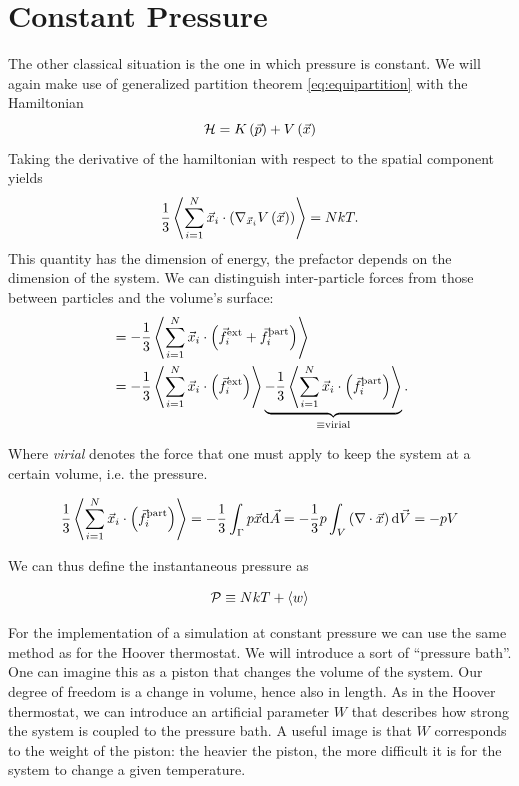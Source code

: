 \section{Constant Pressure}

The other classical situation is the one in which pressure is constant. We will again make use of generalized partition theorem \eqref{eq:equipartition} with the Hamiltonian
\begin{equation*}
\mathcal{H} = K\left(\vec{p}\right) + V\left(\vec{x}\right)
\end{equation*}
Taking the derivative of the hamiltonian with respect to the spatial component yields
\begin{equation*}
\frac{1}{3}\left<    \sum^N_{i=1}\vec{x}_i \cdot \left( \nabla_{\vec{x}_i} V\left(\vec{x}\right)   \right)    \right> = NkT.
\end{equation*}
This quantity has the dimension of energy, the prefactor depends on the dimension of the system. We can distinguish inter-particle forces  from those between particles and the volume's surface:
\begin{align*}
&=-\frac{1}{3}\left<    \sum^N_{i=1}\vec{x}_i \cdot \left( \vec{f}_i^{\text{ext}} + \vec{f}_i^{\text{part}}   \right)    \right> \\
&=-\frac{1}{3}\left<\sum^N_{i=1}\vec{x}_i \cdot \left( \vec{f}_i^{\text{ext}}   \right)    \right> 
\underbrace{-\frac{1}{3}\left<\sum^N_{i=1}\vec{x}_i \cdot \left(  \vec{f}_i^{\text{part}}   \right)    \right> }_{\equiv\text{virial}}.
\end{align*}

Where \emph{virial} denotes the force that one must apply to keep the system at a certain volume, i.e. the pressure.

\begin{equation*}
\frac{1}{3}\left<\sum^N_{i=1}\vec{x}_i \cdot \left(  \vec{f}_i^{\text{part}}   \right)    \right> 
=
-\frac{1}{3} \int_\Gamma p\vec{x} \text{d}\vec{A}
=
-\frac{1}{3} p \int_V \left(\nabla\cdot\vec{x}\right) \text{d}\vec{V} 
=
-pV
\end{equation*}

We can thus define the instantaneous pressure as

\begin{equation}
\mathcal{P}  \equiv NkT + \left<w\right>
\label{eq:inst_press}
\end{equation}


For the implementation of a simulation at constant pressure we can use the same method as for the Hoover thermostat. We will introduce a sort of ``pressure bath''. One can imagine this as a piston that changes the volume of the system. Our degree of freedom is a change in volume, hence also in length. As in the Hoover thermostat, we can introduce an artificial parameter 
$W$ that describes how strong the system is coupled to the pressure bath. A useful image is that $W$ corresponds to the weight of the piston: the heavier the piston, the more difficult it is for the system to change a given temperature.

